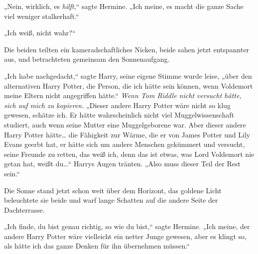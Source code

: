 „Nein, wirklich, es \emph{hilft},“ sagte Hermine. „Ich meine, es macht die ganze Sache viel weniger stalkerhaft.“

„Ich weiß, nicht wahr?“

Die beiden teilten ein kameradschaftliches Nicken, beide sahen jetzt entspannter aus, und betrachteten gemeinsam den Sonnenaufgang.

„Ich habe nachgedacht,“ sagte Harry, seine eigene Stimme wurde leise, „über den alternativen Harry Potter, die Person, die ich hätte sein können, wenn Voldemort meine Eltern nicht angegriffen hätte.“
\emph{Wenn Tom Riddle nicht versucht hätte, sich auf mich zu kopieren.}
„Dieser andere Harry Potter wäre nicht so klug gewesen, schätze ich. Er hätte wahrscheinlich nicht viel Muggelwissenschaft studiert, auch wenn seine Mutter eine Muggelgeborene war. Aber dieser andere Harry Potter hätte… die Fähigkeit zur Wärme, die er von James Potter und Lily Evans geerbt hat, er hätte sich um andere Menschen gekümmert und versucht, seine Freunde zu retten, das weiß ich, denn das ist etwas, was Lord Voldemort nie getan hat, weißt du…“
Harrys Augen tränten.
„Also muss dieser Teil der Rest sein.“

Die Sonne stand jetzt schon weit über dem Horizont, das goldene Licht beleuchtete sie beide und warf lange Schatten auf die andere Seite der Dachterrasse.

„Ich finde, du bist genau richtig, so wie du bist,“ sagte Hermine. „Ich meine, der andere Harry Potter wäre vielleicht ein netter Junge gewesen, aber es klingt so, als hätte ich das ganze Denken für ihn übernehmen müssen.“

